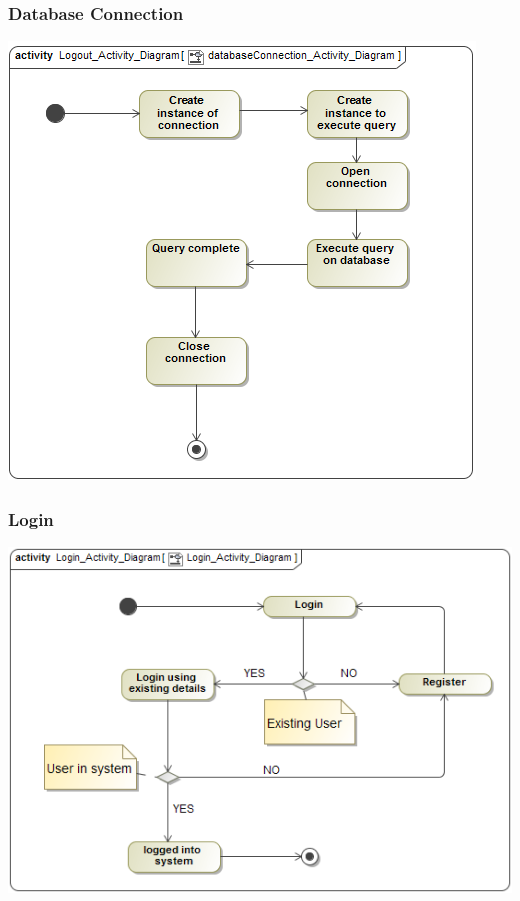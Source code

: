 \documentclass[11pt]{article}
\begin{document}
	\newpage
	\subsubsection{Database Connection}
	\begin{center}
		\includegraphics[width=\textwidth]{../Images/Database_Connection_Activity_Diagram.png}\\[0.5cm]
	\end{center}
	
	\newpage
	\subsubsection{Login}
	\begin{center}
		\includegraphics[width=\textwidth]{../Images/Login_Activity_Diagram.png}\\[0.5cm]
	\end{center}
	
\end{document}
